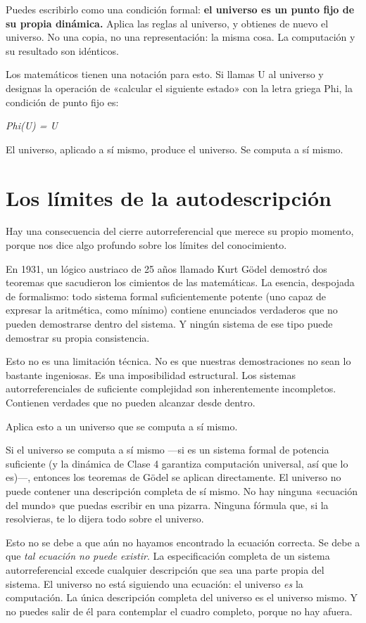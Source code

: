 \documentclass[11pt, twoside, openright]{book}
\begin{document}
Puedes escribirlo como una condición formal: \textbf{el universo es un punto fijo de su propia dinámica.} Aplica las reglas al universo, y obtienes de nuevo el universo. No una copia, no una representación: la misma cosa. La computación y su resultado son idénticos.

Los matemáticos tienen una notación para esto. Si llamas U al universo y designas la operación de «calcular el siguiente estado» con la letra griega Phi, la condición de punto fijo es:

\textit{Phi(U) = U}

El universo, aplicado a sí mismo, produce el universo. Se computa a sí mismo.


\section*{Los límites de la autodescripción}

Hay una consecuencia del cierre autorreferencial que merece su propio momento, porque nos dice algo profundo sobre los límites del conocimiento.

En 1931, un lógico austriaco de 25 años llamado Kurt Gödel demostró dos teoremas que sacudieron los cimientos de las matemáticas. La esencia, despojada de formalismo: todo sistema formal suficientemente potente (uno capaz de expresar la aritmética, como mínimo) contiene enunciados verdaderos que no pueden demostrarse dentro del sistema. Y ningún sistema de ese tipo puede demostrar su propia consistencia.

Esto no es una limitación técnica. No es que nuestras demostraciones no sean lo bastante ingeniosas. Es una imposibilidad estructural. Los sistemas autorreferenciales de suficiente complejidad son inherentemente incompletos. Contienen verdades que no pueden alcanzar desde dentro.

Aplica esto a un universo que se computa a sí mismo.

Si el universo se computa a sí mismo ---si es un sistema formal de potencia suficiente (y la dinámica de Clase 4 garantiza computación universal, así que lo es)---, entonces los teoremas de Gödel se aplican directamente. El universo no puede contener una descripción completa de sí mismo. No hay ninguna «ecuación del mundo» que puedas escribir en una pizarra. Ninguna fórmula que, si la resolvieras, te lo dijera todo sobre el universo.

Esto no se debe a que aún no hayamos encontrado la ecuación correcta. Se debe a que \textit{tal ecuación no puede existir}. La especificación completa de un sistema autorreferencial excede cualquier descripción que sea una parte propia del sistema. El universo no está siguiendo una ecuación: el universo \textit{es} la computación. La única descripción completa del universo es el universo mismo. Y no puedes salir de él para contemplar el cuadro completo, porque no hay afuera.
\end{document}
